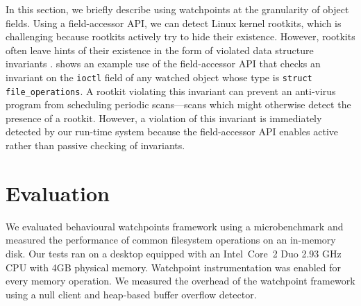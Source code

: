\documentclass[letterpaper,twocolumn,10pt]{article}
\begin{document}
In this section, we briefly describe using watchpoints at the granularity of object fields. Using a field-accessor API, we can detect Linux kernel rootkits, which is challenging because rootkits actively try to hide their existence. However, rootkits often leave hints of their existence in the form of violated data structure invariants \cite{GibraltarKernelInvariants,OSck}. 
 shows an example use of the field-accessor API that checks an invariant on the \texttt{ioctl} field of any watched object whose type is \texttt{struct file\_operations}. A rootkit violating this invariant can prevent an anti-virus program from scheduling periodic scans---scans which might otherwise detect the presence of a rootkit. However, a violation of this invariant is immediately detected by our run-time system because the field-accessor API enables active rather than passive checking of invariants.


\section{Evaluation}

We evaluated behavioural watchpoints framework using a microbenchmark and measured the performance of common filesystem operations on an in-memory disk. Our tests ran on a desktop equipped with an Intel\textregistered\ Core\texttrademark\ 2 Duo 2.93 GHz CPU with 4GB physical memory. Watchpoint instrumentation was enabled for every memory operation. We measured the overhead of the watchpoint framework using a null client and heap-based buffer overflow detector. %
\end{document}
